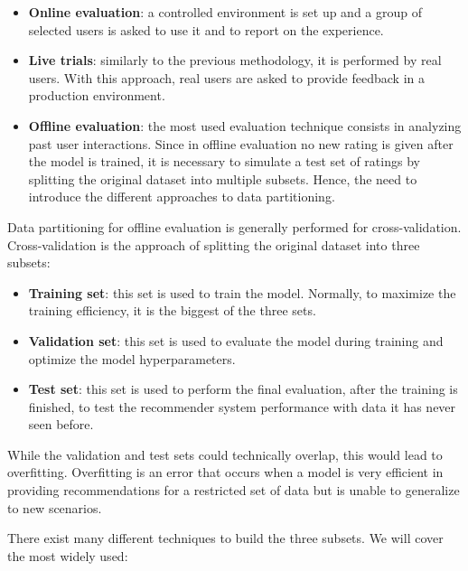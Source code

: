 \begin{itemize}
\item \textbf{Online evaluation}: a controlled environment is set up and a group of selected users is asked to use it and to report on the experience.
\item \textbf{Live trials}: similarly to the previous methodology, it is performed by real users. With this approach, real users are asked to provide feedback in a production environment.
\item \textbf{Offline evaluation}: the most used evaluation technique consists in analyzing past user interactions. Since in offline evaluation no new rating is given after the model is trained, it is necessary to simulate a test set of ratings by splitting the original dataset into multiple subsets. Hence, the need to introduce the different approaches to data partitioning.
\end{itemize}

Data partitioning for offline evaluation is generally performed for cross-validation. Cross-validation is the approach of splitting the original dataset into three subsets:
\begin{itemize}
\item \textbf{Training set}: this set is used to train the model. Normally, to maximize the training efficiency, it is the biggest of the three sets.
\item \textbf{Validation set}: this set is used to evaluate the model during training and optimize the model hyperparameters.
\item \textbf{Test set}: this set is used to perform the final evaluation, after the training is finished, to test the recommender system performance with data it has never seen before.
\end{itemize}
While the validation and test sets could technically overlap, this would lead to overfitting. Overfitting is an error that occurs when a model is very efficient in providing recommendations for a restricted set of data but is unable to generalize to new scenarios.

There exist many different techniques to build the three subsets. We will cover the most widely used:

